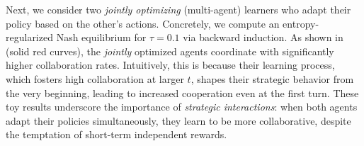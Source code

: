 Next, we consider two \textit{jointly optimizing} (multi-agent) learners who adapt their policy based on the other's actions. Concretely, we compute an  entropy-regularized Nash equilibrium for \(\tau=0.1\) via backward induction. 
As shown in  (solid red curves), the \textit{jointly} optimized agents coordinate with significantly higher collaboration rates. Intuitively, this is because their learning process, which fosters high collaboration at larger $t$, shapes their strategic behavior from the very beginning, leading to increased cooperation even at the first turn. 
These toy results underscore the importance of \textit{strategic interactions}: when both agents adapt their policies simultaneously, they learn to be more collaborative,  despite the temptation of short-term independent rewards. 
\safevspace{-2mm}













